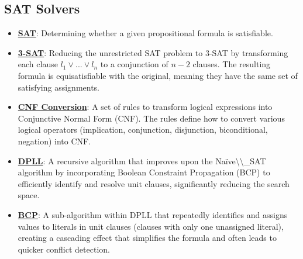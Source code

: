 \documentclass{article}%
\begin{document}
%
\subsection{SAT Solvers}%
\label{subsec:SATSolvers}%
\begin{itemize}[leftmargin=*]%
\item \href{https://purdue.brightspace.com/d2l/common/assets/pdfjs-d2l-dist/1.0.14-legacy/web/viewer.html?file=\%2Fcontent\%2Fenforced\%2F1095467-wl.202510.CS.24300.001\%2F13L1-Logic.pdf\%3Fou\%3D1095467\&lang=en-us\&container=d2l-fileviewer-rendered-pdf\&fullscreen=d2l-fileviewer-rendered-pdf-dialog\&height=667#page=15}{\textbf{SAT}}: Determining whether a given propositional formula is satisfiable.%
\item \href{https://purdue.brightspace.com/d2l/common/assets/pdfjs-d2l-dist/1.0.14-legacy/web/viewer.html?file=\%2Fcontent\%2Fenforced\%2F1095467-wl.202510.CS.24300.001\%2F13L1-Logic.pdf\%3Fou\%3D1095467\&lang=en-us\&container=d2l-fileviewer-rendered-pdf\&fullscreen=d2l-fileviewer-rendered-pdf-dialog\&height=667#page=24}{\textbf{3-SAT}}: Reducing the unrestricted SAT problem to 3-SAT by transforming each clause $l_1 \lor ... \lor l_n$ to a conjunction of $n-2$ clauses. The resulting formula is equisatisfiable with the original, meaning they have the same set of satisfying assignments.%
\item \href{https://purdue.brightspace.com/d2l/common/assets/pdfjs-d2l-dist/1.0.14-legacy/web/viewer.html?file=\%2Fcontent\%2Fenforced\%2F1095467-wl.202510.CS.24300.001\%2F13L1-Logic.pdf\%3Fou\%3D1095467\&lang=en-us\&container=d2l-fileviewer-rendered-pdf\&fullscreen=d2l-fileviewer-rendered-pdf-dialog\&height=667#page=17}{\textbf{CNF Conversion}}: A set of rules to transform logical expressions into Conjunctive Normal Form (CNF). The rules define how to convert various logical operators (implication, conjunction, disjunction, biconditional, negation) into CNF.%
\item \href{https://purdue.brightspace.com/d2l/common/assets/pdfjs-d2l-dist/1.0.14-legacy/web/viewer.html?file=\%2Fcontent\%2Fenforced\%2F1095467-wl.202510.CS.24300.001\%2F15L2-SAT.pdf\%3Fou\%3D1095467\&lang=en-us\&container=d2l-fileviewer-rendered-pdf\&fullscreen=d2l-fileviewer-rendered-pdf-dialog\&height=667#page=17}{\textbf{DPLL}}: A recursive algorithm that improves upon the Naïve\textbackslash{}\textbackslash{}_SAT algorithm by incorporating Boolean Constraint Propagation (BCP) to efficiently identify and resolve unit clauses, significantly reducing the search space.%
\item \href{https://purdue.brightspace.com/d2l/common/assets/pdfjs-d2l-dist/1.0.14-legacy/web/viewer.html?file=\%2Fcontent\%2Fenforced\%2F1095467-wl.202510.CS.24300.001\%2F15L2-SAT.pdf\%3Fou\%3D1095467\&lang=en-us\&container=d2l-fileviewer-rendered-pdf\&fullscreen=d2l-fileviewer-rendered-pdf-dialog\&height=667#page=20}{\textbf{BCP}}: A sub-algorithm within DPLL that repeatedly identifies and assigns values to literals in unit clauses (clauses with only one unassigned literal), creating a cascading effect that simplifies the formula and often leads to quicker conflict detection.%

\end{itemize}
\end{document}
